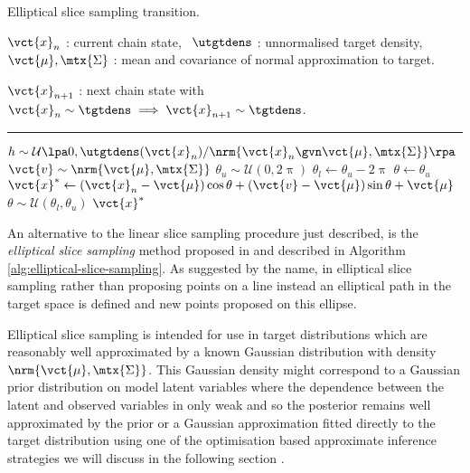 \begin{algorithm}[!t]
\caption{Elliptical slice sampling transition.}
\label{alg:elliptical-slice-sampling}
\begin{algorithmic}
\small
    \Require
    $\vct{x}_n$ : current chain state,~
    $\utgtdens$ : unnormalised target density,\\
    $\vct{\mu},\mtx{\Sigma}$ : mean and covariance of normal approximation to target.
    \Ensure\raggedright
    $\vct{x}_{n+1}$ : next chain state with $\vct{x}_n \sim \tgtdens \implies \vct{x}_{n+1} \sim \tgtdens$.
\end{algorithmic}
\hrule
\small
\begin{algorithmic}[1]
  \State $h \sim \mathcal{U}\lpa 0,\utgtdens(\vct{x}_n) / \nrm{\vct{x}_n \gvn \vct{\mu}, \mtx{\Sigma}}\rpa$ 
  \State $\vct{v} \sim \nrm{\vct{\mu}, \mtx{\Sigma}}$ 
  \State $\theta_u \sim \mathcal{U}(0,2\uppi)$ 
  \State $\theta_l \gets \theta_u - 2\uppi$
  \State $\theta \gets \theta_u$
    \State $\vct{x}^* \gets (\vct{x}_n - \vct{\mu}) \cos\theta + (\vct{v} - \vct{\mu}) \sin\theta + \vct{\mu}$  
     
       
      \State $\theta \sim \mathcal{U}(\theta_l, \theta_u)$ 
    \Else
      \State \Return $\vct{x}^*$
    \EndIf
  \EndWhile
\end{algorithmic}
\end{algorithm}

An alternative to the linear slice sampling procedure just described, is the \emph{elliptical slice sampling} method proposed in \citep{murray2010elliptical} and described in Algorithm \ref{alg:elliptical-slice-sampling}. As suggested by the name, in elliptical slice sampling rather than proposing points on a line instead an elliptical path in the target space is defined and new points proposed on this ellipse. 

Elliptical slice sampling is intended for use in target distributions which are reasonably well approximated by a known Gaussian distribution with density $\nrm{\vct{\mu},\mtx{\Sigma}}$. This Gaussian density might correspond to a Gaussian prior distribution on model latent variables where the dependence between the latent and observed variables in only weak and so the posterior remains well approximated by the prior or a Gaussian approximation fitted directly to the target distribution using one of the optimisation based approximate inference strategies we will discuss in the following section \citep{nishihara2014parallel}. 


